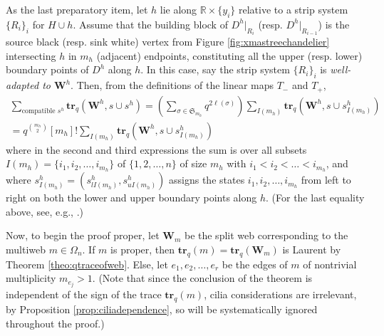 \documentclass[12pt, reqno]{amsart}
\theoremstyle{definition}
\newcommand{\R}{\mathbb{R}}%
\newcommand{\trq}{\mathbf{tr}_q}%
\begin{document}
As the last preparatory item, let $h$ lie along $\R\times\{y_i\}$ relative to a strip system $\{R_i\}_i$ for $H\cup h$.  Assume that the building block of $D^h|_{R_i}$ (resp. $D^h|_{R_{i-1}}$) is the source black (resp. sink white) vertex from Figure \ref{fig:xmastreechandelier} intersecting $h$ in $m_h$ (adjacent) endpoints, constituting all the upper (resp. lower) boundary points of $D^h$ along $h$.  In this case, say the strip system $\{R_i\}_i$ is \emph{well-adapted to $\mathbf{W}^h$}.  Then, from the definitions of the linear maps $T_-$ and $T_+$,  
\begin{gather*}
\sum_{\text{compatible }s^h}\trq(\mathbf{W}^h,s\cup s^h)
=\left( \sum_{\sigma\in\mathfrak{S}_{m_h}}q^{2\ell(\sigma)} \right)\sum_{I(m_h)}\trq(\mathbf{W}^h,s\cup s^h_{I(m_h)})
\\=q^{\binom{m_h}{2}}[m_h]!\sum_{I(m_h)}\trq(\mathbf{W}^h, s\cup s^h_{I(m_h)})
\end{gather*} 
where in the second and third expressions the sum is over all subsets $I(m_h)=\{i_1,i_2,\dots,i_{m_h}\}$ of $\{1,2,\dots,n\}$ of size $m_h$ with $i_1<i_2<\dots<i_{m_h}$, and where $s^h_{I(m_h)}=(s^h_{lI(m_h)},s^h_{uI(m_h)})$ assigns the states $i_1,i_2,\dots,i_{m_h}$ from left to right on both the lower and upper boundary points along $h$.  (For the last equality above, see, e.g., \cite{sikora1}.)

Now, to begin the proof proper, let $\mathbf{W}_m$ be the split web corresponding to the multiweb $m\in\Omega_n$.  If $m$ is proper, then $\trq(m)=\trq(\mathbf{W}_m)$ is Laurent by Theorem \ref{theo:qtraceofweb}.  Else, let $e_1, e_2, \dots, e_r$ be the edges of $m$ of nontrivial multiplicity $m_{e_j}>1$.  (Note that since the conclusion of the theorem is independent of the sign of the trace $\trq(m)$, cilia considerations are irrelevant, by Proposition \ref{prop:ciliadependence}, so will be systematically ignored throughout the proof.)
\end{document}
